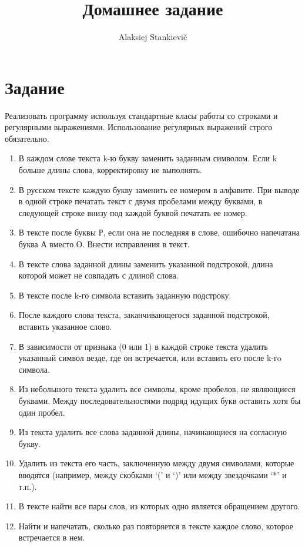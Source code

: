 \documentclass[12pt]{article}
\author{Alaksiej Stankievič}
\title{Домашнее задание}
\begin{document}

\section{Задание}

Реализовать программу используя стандартные класы работы со строками и 
регулярными выражениями. Использование регулярных выражений строго обязательно.

\begin{enumerate}
	\item В каждом слове текста k-ю букву заменить заданным символом. Если k 
больше длины слова, корректировку не выполнять.
	\item В русском тексте каждую букву заменить ее номером в алфавите. При 
выводе в одной строке печатать текст с двумя пробелами между буквами, в 
следующей строке внизу под каждой буквой печатать ее номер.
	\item В тексте после буквы Р, если она не последняя в слове, ошибочно 
напечатана буква А вместо О. Внести исправления в текст.
	\item В тексте слова заданной длины заменить указанной подстрокой, длина 
которой может не совпадать с длиной слова.
	\item В тексте после k-го символа вставить заданную подстроку.
	\item После каждого слова текста, заканчивающегося заданной подстрокой, 
вставить указанное слово.
	\item В зависимости от признака (0 или 1) в каждой строке текста удалить 
указанный символ везде, где он встречается, или вставить его после   k-гo 
символа.
	\item Из небольшого текста удалить все символы, кроме пробелов, не 
являющиеся буквами. Между последовательностями подряд идущих букв оставить хотя 
бы один пробел.
	\item Из текста удалить все слова заданной длины, начинающиеся на согласную 
букву.
	\item Удалить из текста его часть, заключенную между двумя символами, 
которые вводятся (например, между скобками ‘(’ и ‘)’ или между звездочками ‘*’ 
и т.п.).
	\item В тексте найти все пары слов, из которых одно является обращением 
другого.
	\item Найти и напечатать, сколько раз повторяется в тексте каждое слово, 
которое встречается в нем.

\end{enumerate}
\end{document}
